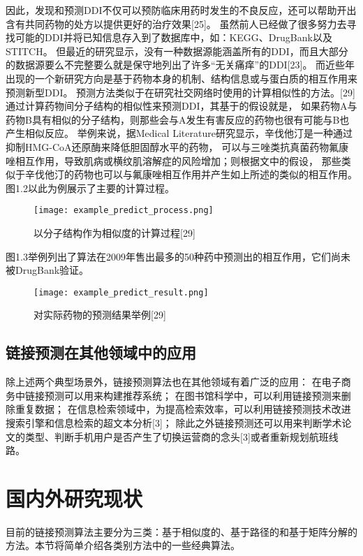 因此，发现和预测DDI不仅可以预防临床用药时发生的不良反应，还可以帮助开出含有共同药物的处方以提供更好的治疗效果[25]。
虽然前人已经做了很多努力去寻找可能的DDI并将已知信息存入到了数据库中，如：KEGG、DrugBank以及STITCH。
但最近的研究显示，没有一种数据源能涵盖所有的DDI，而且大部分的数据源要么不完整要么就是保守地列出了许多“无关痛痒”的DDI[23]。
而近些年出现的一个新研究方向是基于药物本身的机制、结构信息或与蛋白质的相互作用来预测新型DDI。
预测方法类似于在研究社交网络时使用的计算相似性的方法。[29]通过计算药物间分子结构的相似性来预测DDI，其基于的假设就是，
如果药物A与药物B具有相似的分子结构，则那些会与A发生有害反应的药物也很有可能与B也产生相似反应。
举例来说，据Medical Literature研究显示，辛伐他汀是一种通过抑制HMG-CoA还原酶来降低胆固醇水平的药物，
可以与三唑类抗真菌药物氟康唑相互作用，导致肌病或横纹肌溶解症的风险增加；则根据文中的假设，
那些类似于辛伐他汀的药物也可以与氟康唑相互作用并产生如上所述的类似的相互作用。
图1.2以此为例展示了主要的计算过程。

\begin{figure} 
  \centering
  \texttt{[image: example\_predict\_process.png]}
  \caption{以分子结构作为相似度的计算过程[29]}
  \label{intro:fig:process}
\end{figure} 
图1.3举例列出了算法在2009年售出最多的50种药中预测出的相互作用，它们尚未被DrugBank验证。

\begin{figure} 
  \centering
  \texttt{[image: example\_predict\_result.png]}
  \caption{对实际药物的预测结果举例[29]}
  \label{intro:fig:result}
\end{figure} 

\subsection{链接预测在其他领域中的应用}
除上述两个典型场景外，链接预测算法也在其他领域有着广泛的应用：
在电子商务中链接预测可以用来构建推荐系统；
在图书馆科学中，可以利用链接预测来删除重复数据；
在信息检索领域中，为提高检索效率，可以利用链接预测技术改进搜索引擎和信息检索的超文本分析[3]；
除此之外链接预测还可以用来判断学术论文的类型、判断手机用户是否产生了切换运营商的念头[3]或者重新规划航班线路。


\section{国内外研究现状}
\label{intro:sec:study}
目前的链接预测算法主要分为三类：基于相似度的、基于路径的和基于矩阵分解的方法。本节将简单介绍各类别方法中的一些经典算法。

